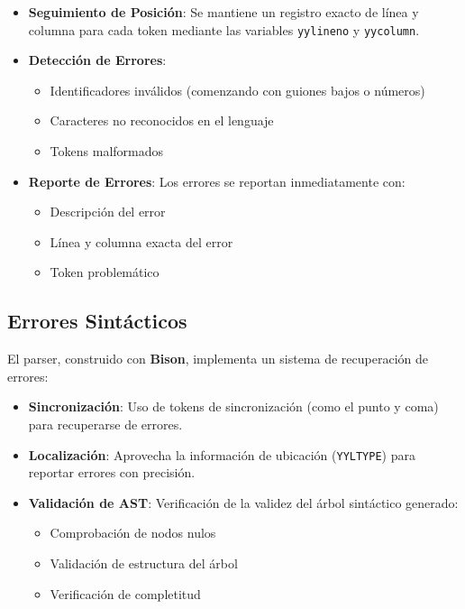 \documentclass[11pt, a4paper, twoside]{article} %
\begin{document}
\begin{itemize}
    \item \textbf{Seguimiento de Posición}: Se mantiene un registro exacto de línea y columna para cada token mediante las variables \texttt{yylineno} y \texttt{yycolumn}.
    \item \textbf{Detección de Errores}:
    \begin{itemize}
        \item Identificadores inválidos (comenzando con guiones bajos o números)
        \item Caracteres no reconocidos en el lenguaje
        \item Tokens malformados
    \end{itemize}
    \item \textbf{Reporte de Errores}: Los errores se reportan inmediatamente con:
    \begin{itemize}
        \item Descripción del error
        \item Línea y columna exacta del error
        \item Token problemático
    \end{itemize}
\end{itemize}

\subsection{Errores Sintácticos}

El parser, construido con \textbf{Bison}, implementa un sistema de recuperación de errores:

\begin{itemize}
    \item \textbf{Sincronización}: Uso de tokens de sincronización (como el punto y coma) para recuperarse de errores.
    \item \textbf{Localización}: Aprovecha la información de ubicación (\texttt{YYLTYPE}) para reportar errores con precisión.
    \item \textbf{Validación de AST}: Verificación de la validez del árbol sintáctico generado:
    \begin{itemize}
        \item Comprobación de nodos nulos
        \item Validación de estructura del árbol
        \item Verificación de completitud
    \end{itemize}
\end{itemize}
\end{document}
